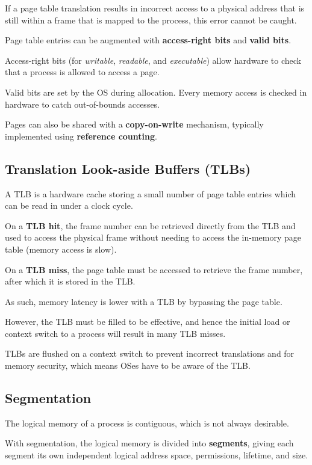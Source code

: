 If a page table translation results in incorrect access to a physical address that is still within a frame that is mapped to the process, this error cannot be caught.

Page table entries can be augmented with \textbf{access-right bits} and \textbf{valid bits}.

Access-right bits (for \textit{writable}, \textit{readable}, and \textit{executable}) allow hardware to check that a process is allowed to access a page.

Valid bits are set by the OS during allocation.
Every memory access is checked in hardware to catch out-of-bounds accesses.

Pages can also be shared with a \textbf{copy-on-write} mechanism, typically implemented using \textbf{reference counting}.


\subsection{Translation Look-aside Buffers (TLBs)}
A TLB is a hardware cache storing a small number of page table entries which can be read in under a clock cycle.

On a \textbf{TLB hit}, the frame number can be retrieved directly from the TLB and used to access the physical frame without needing to access the in-memory page table (memory access is slow).

On a \textbf{TLB miss}, the page table must be accessed to retrieve the frame number, after which it is stored in the TLB.

As such, memory latency is lower with a TLB by bypassing the page table.

However, the TLB must be filled to be effective, and hence the initial load or context switch to a process will result in many TLB misses.

TLBs are flushed on a context switch to prevent incorrect translations and for memory security, which means OSes have to be aware of the TLB.


\subsection{Segmentation}
The logical memory of a process is contiguous, which is not always desirable.

With segmentation, the logical memory is divided into \textbf{segments},
giving each segment its own independent logical address space, permissions, lifetime, and size.

